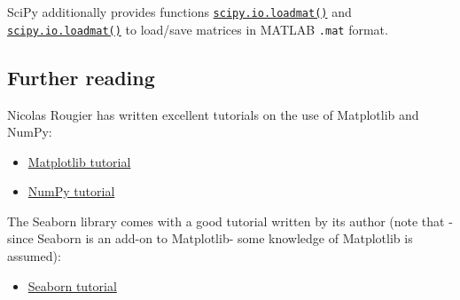 \documentclass[english,serif,mathserif,xcolor=pdftex,dvipsnames,table]{beamer}
\begin{document}
SciPy additionally provides functions
\href{https://docs.scipy.org/doc/scipy/reference/generated/scipy.io.loadmat.html}{\texttt{scipy.io.loadmat()}}
and
\href{https://docs.scipy.org/doc/scipy/reference/generated/scipy.io.savemat.html}{\texttt{scipy.io.loadmat()}}
to load/save matrices in MATLAB \texttt{.mat} format.

\subsection{Further reading}\label{further-reading}

Nicolas Rougier has written excellent tutorials on the use of Matplotlib
and NumPy:

\begin{itemize}
\tightlist
\item
  \href{https://www.labri.fr/perso/nrougier/teaching/matplotlib/}{Matplotlib
  tutorial}
\item
  \href{http://www.labri.fr/perso/nrougier/teaching/numpy/numpy.html}{NumPy
  tutorial}
\end{itemize}

The Seaborn library comes with a good tutorial written by its author
(note that -since Seaborn is an add-on to Matplotlib- some knowledge of
Matplotlib is assumed):

\begin{itemize}
\tightlist
\item
  \href{http://seaborn.pydata.org/tutorial.html}{Seaborn tutorial}
\end{itemize}
\end{document}

